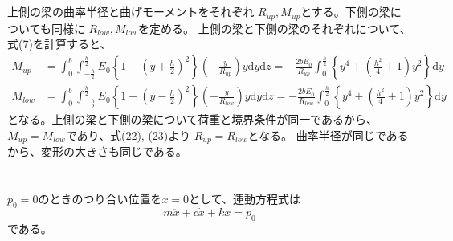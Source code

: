 \documentclass[a4paper]{jsarticle}
\begin{document}
\subsection{}
上側の梁の曲率半径と曲げモーメントをそれぞれ
$R_{up}, M_{up}$とする。下側の梁についても同様に
$R_{low}, M_{low}$を定める。
上側の梁と下側の梁のそれぞれについて、式(7)を計算すると、
\begin{align}
  M_{up} &= \int_0^b \int_{-\frac{h}{2}}^{\frac{h}{2}}
  E_0 \left\{1 + \left(y + \frac{h}{2}\right)^2\right\}
  \left(-\frac{y}{R_{up}}\right) y \mathrm{d} y \mathrm{d} z
  = -\frac{2 b E_0}{R_{up}} \int_0^{\frac{h}{2}}
  \left\{y^4 + \left(\frac{h^2}{4} + 1\right) y^2\right\} \mathrm{d} y \\
  M_{low} &= \int_0^b \int_{-\frac{h}{2}}^{\frac{h}{2}}
  E_0 \left\{1 + \left(y - \frac{h}{2}\right)^2\right\}
  \left(-\frac{y}{R_{low}}\right) y \mathrm{d} y \mathrm{d} z
  = -\frac{2 b E_0}{R_{low}} \int_0^{\frac{h}{2}}
  \left\{y^4 + \left(\frac{h^2}{4} + 1\right) y^2\right\} \mathrm{d} y
\end{align}
となる。上側の梁と下側の梁について荷重と境界条件が同一であるから、
$M_{up} = M_{low}$であり、式(22), (23)より
$R_{up} = R_{low}$となる。
曲率半径が同じであるから、変形の大きさも同じである。

\section{}
\subsection{}
$p_0 = 0$のときのつり合い位置を$x = 0$として、運動方程式は
\begin{equation}
  m \ddot{x} + c \dot{x} + kx = p_0
\end{equation}
である。
\end{document}
